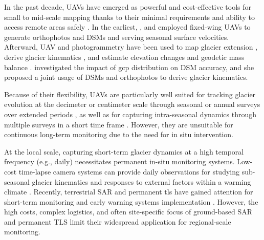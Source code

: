 In the past decade, UAVs have emerged as powerful and cost-effective tools for small to mid-scale mapping thanks to their minimal requirements and ability to access remote areas safely \cite{Bhardwaj2016, Gaffey2020, Sledz2021}.
In the earliest, \citet{Whitehead2013}, \citet{immerzeel2014} and \citet{kraaijenbrink2016} employed fixed-wing UAVs to generate orthophotos and DSMs and serving seasonal surface velocities.
Afterward, UAV and photogrammetry have been used to map glacier extension \cite{belloni2023}, derive glacier kinematics \cite{Benoit2019, Chudley2019, Jouvet2020, ioli2021mid, Cao2021, Lamsters2022}, and estimate elevation changes and geodetic mass balance \cite{Fugazza2018, ioli2021mid, VanTricht2021, Cao2021, Lamsters2022}.
\citet{Gindraux2017} investigated the impact of \ac{gcp} distribution on DSM accuracy, and she proposed a joint usage of DSMs and orthophotos to derive glacier kinematics.

Because of their flexibility, UAVs are particularly well suited for tracking glacier evolution at the decimeter or centimeter scale through seasonal or annual surveys over extended periods  \cite{VanTricht2021, Cao2021, ioli2021mid}, as well as for capturing intra-seasonal dynamics through multiple surveys in a short time frame \cite{immerzeel2014, Chudley2019, Cao2021}. 
However, they are unsuitable for continuous long-term monitoring due to the need for in situ intervention.

At the local scale, capturing short-term glacier dynamics at a high temporal frequency (e.g., daily) necessitates permanent in-situ monitoring systems. 
Low-cost time-lapse camera systems can provide daily observations for studying sub-seasonal glacier kinematics and responses to external factors within a warming climate \citep{Maas2006, Messerli2015, Giordan2016, James2016}.  
Recently, terrestrial SAR \cite{Luzi2007} and permanent \ac{tls} \cite{Hendrickx2022, Voordendag2023} have gained attention for short-term monitoring and early warning systems implementation \citep{Noferini2009, Dematteis2017_sar}. 
However, the high costs, complex logistics, and often site-specific focus of ground-based SAR and permanent TLS limit their widespread application for regional-scale monitoring.

